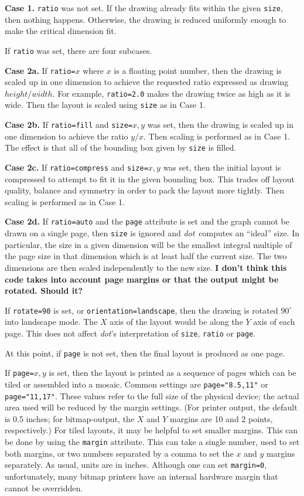 \documentclass[11pt]{article}
\def\dot{{\it dot}}
\begin{document}
{{\bf Case 1.} \verb"ratio" was not set.  
If the drawing already fits within the given \verb"size", then nothing happens.
Otherwise, the drawing is reduced uniformly enough to make the critical
dimension fit.

If \verb"ratio" was set, there are four subcases.

{\bf Case 2a.} If \verb"ratio="$x$ where $x$ is a floating point number,
then the drawing is scaled up in one dimension to achieve the requested
ratio expressed as drawing $height/width$.
For example, \verb"ratio=2.0" makes the drawing twice as high
as it is wide. Then the layout is scaled using \verb"size" as in Case 1.

{\bf Case 2b.} If \verb"ratio=fill" and \verb"size="$x,y$ was set,
then the drawing is scaled up in one dimension to achieve the ratio
$y/x$.
Then scaling is performed as in Case 1.
The effect is that all of the bounding box given by \verb"size" is filled.

{\bf Case 2c.} If \verb"ratio=compress"
and \verb"size="$x,y$ was set, then the initial layout is compressed
to attempt to fit it in the given bounding box.  This trades off
layout quality, balance and symmetry in order to pack the layout more tightly.
Then scaling is performed as in Case 1.

{\bf Case 2d.} If \verb"ratio=auto" and the {\tt page} attribute is
set and the graph cannot be drawn on a single page, 
then \verb"size" is ignored and \dot\ computes an ``ideal'' size.
In particular, the size in a given dimension will be the smallest integral 
multiple of the page size in that dimension which is at least half
the current size.
The two dimensions are then scaled independently to the new size.
{\bf I don't think this code takes into account page margins or that
the output might be rotated. Should it?}
\fi

If \verb"rotate=90" is set, or {\tt orientation=landscape}, 
then the drawing is rotated $90^\circ$ into landscape mode.
The $X$ axis of the layout would be along the $Y$ axis of each page.
This does not affect \dot's interpretation of \verb"size",
\verb"ratio" or \verb"page".

At this point, if \verb"page" is not set, then the final layout is
produced as one page.

If \verb"page="$x,y$ is set, then the layout is printed as a sequence
of pages which can be tiled or assembled into a mosaic. Common settings
are \verb'page="8.5,11"' or \verb'page="11,17"'.  These values
refer to the full size of the physical device; the actual area used
will be reduced by the margin settings.
(For printer output, the default is 0.5 inches;
for bitmap-output, the $X$ and $Y$
margins are 10 and 2 points, respectively.)
For tiled layouts, it may be helpful to set smaller margins. 
This can be done
by using the {\tt margin} attribute. This can take a single number,
used to set both margins, or two numbers separated by a comma to set the
$x$ and $y$ margins separately. As usual, units are in inches. Although one can
set \verb"margin=0", unfortunately, many bitmap printers have an
internal hardware margin that cannot be overridden.

}
\end{document}
